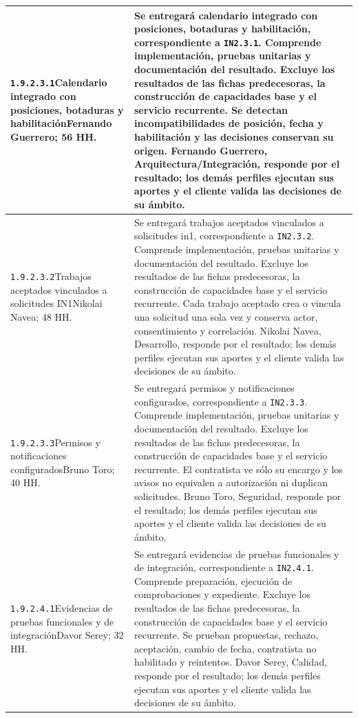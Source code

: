 \begin{longtable}{L{52mm}L{91mm}}
\texttt{1.\allowbreak{}9.\allowbreak{}2.\allowbreak{}3.\allowbreak{}1}\newline Calendario integrado con posiciones, botaduras y habilitación\newline Fernando Guerrero; 56 HH. & Se entregará calendario integrado con posiciones, botaduras y habilitación, correspondiente a \texttt{IN2.3.1}. Comprende implementación, pruebas unitarias y documentación del resultado. Excluye los resultados de las fichas predecesoras, la construcción de capacidades base y el servicio recurrente.  Se detectan incompatibilidades de posición, fecha y habilitación y las decisiones conservan su origen. Fernando Guerrero, Arquitectura/Integración, responde por el resultado; los demás perfiles ejecutan sus aportes y el cliente valida las decisiones de su ámbito.\\\hline
\texttt{1.\allowbreak{}9.\allowbreak{}2.\allowbreak{}3.\allowbreak{}2}\newline Trabajos aceptados vinculados a solicitudes IN1\newline Nikolai Navea; 48 HH. & Se entregará trabajos aceptados vinculados a solicitudes in1, correspondiente a \texttt{IN2.3.2}. Comprende implementación, pruebas unitarias y documentación del resultado. Excluye los resultados de las fichas predecesoras, la construcción de capacidades base y el servicio recurrente.  Cada trabajo aceptado crea o vincula una solicitud una sola vez y conserva actor, consentimiento y correlación. Nikolai Navea, Desarrollo, responde por el resultado; los demás perfiles ejecutan sus aportes y el cliente valida las decisiones de su ámbito.\\\hline
\texttt{1.\allowbreak{}9.\allowbreak{}2.\allowbreak{}3.\allowbreak{}3}\newline Permisos y notificaciones configurados\newline Bruno Toro; 40 HH. & Se entregará permisos y notificaciones configurados, correspondiente a \texttt{IN2.3.3}. Comprende implementación, pruebas unitarias y documentación del resultado. Excluye los resultados de las fichas predecesoras, la construcción de capacidades base y el servicio recurrente.  El contratista ve sólo su encargo y los avisos no equivalen a autorización ni duplican solicitudes. Bruno Toro, Seguridad, responde por el resultado; los demás perfiles ejecutan sus aportes y el cliente valida las decisiones de su ámbito.\\\hline
\texttt{1.\allowbreak{}9.\allowbreak{}2.\allowbreak{}4.\allowbreak{}1}\newline Evidencias de pruebas funcionales y de integración\newline Davor Serey; 32 HH. & Se entregará evidencias de pruebas funcionales y de integración, correspondiente a \texttt{IN2.4.1}. Comprende preparación, ejecución de comprobaciones y expediente. Excluye los resultados de las fichas predecesoras, la construcción de capacidades base y el servicio recurrente.  Se prueban propuestas, rechazo, aceptación, cambio de fecha, contratista no habilitado y reintentos. Davor Serey, Calidad, responde por el resultado; los demás perfiles ejecutan sus aportes y el cliente valida las decisiones de su ámbito.\\\hline

\end{longtable}
